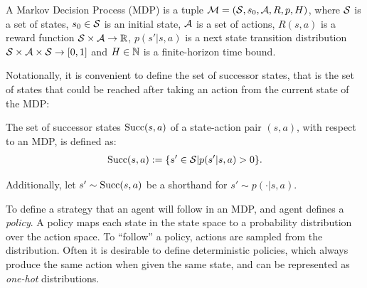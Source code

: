     \begin{defn}
        \label{def:mdp}
        A \textnormal{Markov Decision Process} (MDP) is a tuple $\mathcal{M}=(\mathcal{S},s_0,\mathcal{A},R,p,H)$, where $\mathcal{S}$ is a set of states, $s_0\in\mathcal{S}$ is an initial state, $\mathcal{A}$ is a set of actions, $R(s,a)$ is a reward function $\mathcal{S}\times \mathcal{A}\rightarrow \mathbb{R}$, $p(s' | s,a)$ is a next state transition distribution $\mathcal{S} \times \mathcal{A} \times \mathcal{S} \rightarrow [0,1]$ and $H\in\mathbb{N}$ is a finite-horizon time bound. 
    \end{defn}

    Notationally, it is convenient to define the set of successor states, that is the set of states that could be reached after taking an action from the current state of the MDP:
    \begin{defn}
        \label{def:succ}
        The set of \textnormal{successor states} ${\textnormal{Succ}(s,a)}$ of a state-action pair $(s,a)$, with respect to an MDP, is defined as: 
        \begin{align}
            {\textnormal{Succ}(s,a)}:=\{s'\in\mathcal{S}|p(s'|s,a)>0\}.
        \end{align}
        
        Additionally, let $s'\sim {\textnormal{Succ}(s,a)}$ be a shorthand for $s'\sim p(\cdot|s,a)$.
    \end{defn}

    To define a strategy that an agent will follow in an MDP, and agent defines a \textit{policy}. A policy maps each state in the state space to a probability distribution over the action space. To ``follow'' a policy, actions are sampled from the distribution. Often it is desirable to define deterministic policies, which always produce the same action when given the same state, and can be represented as \textit{one-hot} distributions. 

